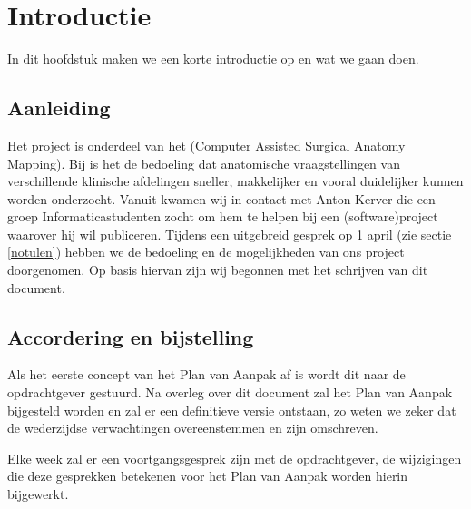 \section{Introductie}


In dit hoofdstuk maken we een korte introductie op \casam en wat we gaan doen. 
 
\subsection{Aanleiding}


Het project is onderdeel van het \casamproject (Computer Assisted Surgical Anatomy Mapping). 
Bij \casam is het de bedoeling dat anatomische vraagstellingen van verschillende klinische afdelingen sneller, makkelijker en vooral duidelijker kunnen worden onderzocht.
Vanuit \casam kwamen wij in contact met Anton Kerver die een groep Informaticastudenten zocht om hem te helpen bij een (software)project waarover hij wil publiceren. 
Tijdens een uitgebreid gesprek op 1 april (zie sectie \ref{notulen}) hebben we de bedoeling en de mogelijkheden van ons project doorgenomen.
Op basis hiervan zijn wij begonnen met het schrijven van dit document.
\subsection{Accordering en bijstelling}


Als het eerste concept van het Plan van Aanpak af is wordt dit naar de opdrachtgever gestuurd.
Na overleg over dit document zal het Plan van Aanpak bijgesteld worden en zal er een definitieve versie ontstaan, zo weten we zeker dat de wederzijdse verwachtingen overeenstemmen en zijn omschreven. 

Elke week zal er een voortgangsgesprek zijn met de opdrachtgever, de wijzigingen die deze gesprekken betekenen voor het Plan van Aanpak worden hierin bijgewerkt.

